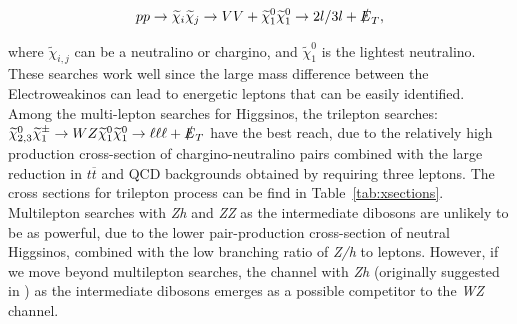 \documentclass[a4paper,11pt]{article}
\newcommand{\met}{{\slashed{E}_T}}
\begin{document}
\begin{align}
  pp\rightarrow \widetilde{\chi}_i\widetilde{\chi}_j\rightarrow VV +
  \widetilde{\chi}_1^0\widetilde{\chi}_1^0\rightarrow 2l/3l +  
  \met,
\end{align}

\noindent where $\widetilde{\chi}_{i,j}$ can be a neutralino or chargino, and
$\widetilde{\chi}_1^0$ is the lightest neutralino. These searches work well since
the large mass difference between the Electroweakinos can lead to energetic
leptons that can be easily identified. Among the multi-lepton searches for
Higgsinos, the trilepton searches: $\widetilde\chi_{2,3}^0\widetilde\chi_1^\pm\rightarrow WZ\widetilde\chi_1^0\widetilde\chi_1^0\rightarrow \ell\ell\ell + \met$ have the best reach, due to the relatively high production cross-section of
chargino-neutralino pairs combined with the large reduction in $t\overline{t}$
and QCD backgrounds obtained by requiring three leptons.   The cross sections for trilepton process can be find in Table~\ref{tab:xsections}. Multilepton searches
with \emph{Zh} and \emph{ZZ} as the intermediate dibosons are unlikely to be as powerful,
due to the lower pair-production cross-section of neutral Higgsinos, combined
with the low branching ratio of \emph{Z/h} to leptons. However, if we move beyond
multilepton searches, the channel with \emph{Zh} (originally suggested in
\citep{Han:2013kza}) as the intermediate dibosons emerges as a possible
competitor to the \emph{WZ} channel.  
\end{document}
